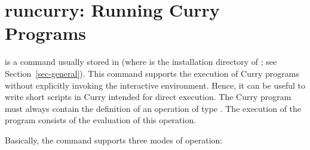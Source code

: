 \section{runcurry: Running Curry Programs}

is a command usually stored in 
(where \cyshome is the installation directory of \CYS;
see Section~\ref{sec-general}).
This command supports the execution of Curry programs
without explicitly invoking the interactive environment.
Hence, it can be useful to write short scripts in Curry
intended for direct execution.
The Curry program must always contain the definition of an operation
 of type .
The execution of the program consists of the evaluation of this operation.

Basically, the command  supports three modes of operation:
